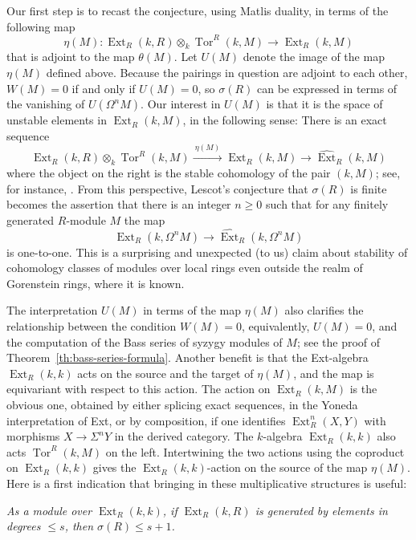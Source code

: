 \documentclass{amsart}
\numberwithin{equation}{section}
\theoremstyle{plain}
\theoremstyle{definition}
\theoremstyle{remark}
\newcommand{\ext}{\operatorname{Ext}}
\newcommand{\tor}{\operatorname{Tor}}
\begin{document}
Our first step is to recast the conjecture, using Matlis duality, in terms of the following map 
\begin{equation*}
\eta(M)\colon  \ext_R(k,R)\otimes_k \tor^R(k,M)\longrightarrow \ext_R(k,M)
\end{equation*}
that is adjoint to the map $\theta(M)$.  Let $U(M)$ denote the image of the map $\eta(M)$ defined above. Because the pairings in question are adjoint to each other, $W(M)=0$ if and only if $U(M)=0$, so $\sigma(R)$ can be expressed in terms of the vanishing of $U(\Omega^nM)$. Our interest in $U(M)$ is that it is the space of unstable elements in $\ext_R(k,M)$, in the following sense: There is an exact sequence
\[
\ext_R(k,R)\otimes_k \tor^R(k,M)\xrightarrow{\ \eta(M)\ } \ext_R(k,M)\longrightarrow \widehat{\ext}_R(k,M)
\]
where the object on the right is the stable cohomology of the pair $(k,M)$; see, for instance, \cite{Avramov/Veliche:2007}. From this perspective, Lescot's conjecture that  $\sigma(R)$ is finite becomes the assertion that there is an integer $n\ge 0$ such that for any finitely generated $R$-module $M$ the map
\[
\ext_R(k,\Omega^nM)\longrightarrow \widehat{\ext}_R(k,\Omega^n M)
\]
is one-to-one. This is a surprising and unexpected (to us) claim about stability of cohomology classes of modules over local rings even outside the realm of Gorenstein rings, where it is known. 

The interpretation $U(M)$ in terms of the map $\eta(M)$ also clarifies the relationship between the condition $W(M)=0$, equivalently, $U(M)=0$, and the computation of the Bass series of syzygy modules of $M$; see the proof of Theorem~\ref{th:bass-series-formula}. Another benefit is that the Ext-algebra $\ext_R(k,k)$ acts on the source and the target of $\eta(M)$, and the map is equivariant with respect to this action. The action on $\ext_R(k,M)$ is the obvious one, obtained by either splicing exact sequences, in the Yoneda interpretation of Ext, or by composition, if one identifies $\ext^n_R(X,Y)$ with morphisms $X\to \Sigma^nY$ in the derived category. The $k$-algebra $\ext_R(k,k)$ also acts $\tor^R(k,M)$ on the left. Intertwining the two actions using the coproduct on $\ext_R(k,k)$ gives the $\ext_R(k,k)$-action on the source of the map $\eta(M)$.
Here is a first indication that bringing in these multiplicative structures is useful: 

\medskip

\emph{
As a module over $\ext_R(k,k)$, if $\ext_R(k,R)$ is generated by elements in degrees $\leq s$,  then $\sigma(R)\le s+1$.
} 
\end{document}
